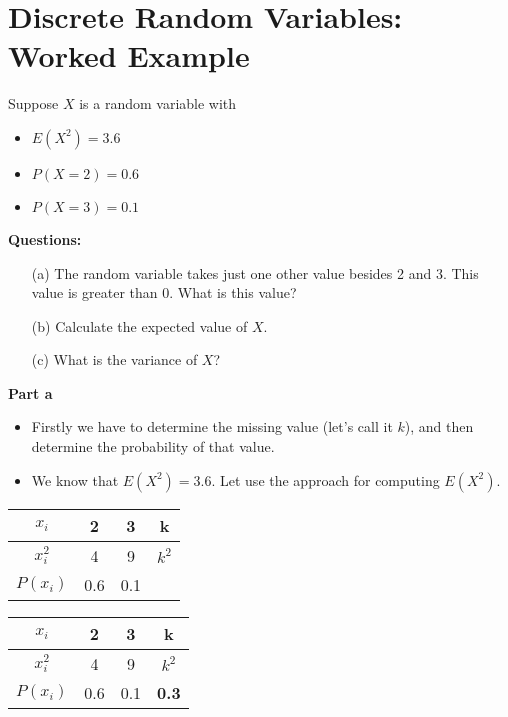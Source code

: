 \documentclass[a4paper,12pt]{article}
\begin{document}
\section*{Discrete Random Variables: Worked Example}

Suppose $X$ is a random variable with 
\begin{itemize}
\item $E(X^2)=3.6$
\item $P(X=2)=0.6$
\item $P(X=3)=0.1$
\end{itemize}


\noindent \textbf{Questions:}
\begin{itemize}
\item[(a)] The random variable takes just one other value besides 2 and 3. This value is greater than 0. What is this value?
\item[(b)] Calculate the expected value of $X$.
\item[(c)] What is the variance of $X$?
\end{itemize}





\noindent \textbf{Part a}
\begin{itemize}
\item Firstly we have to determine the missing value (let's call it $k$), and then determine the probability of that value. 
\item We know that $E(X^2)=3.6$. Let use the approach for computing $E(X^2)$.

\end{itemize}

\begin{center}
\begin{tabular}{|c|c|c|c|}
\hline
$x_i$ & \phantom{sp}2\phantom{sp} & \phantom{sp}3\phantom{sp} & \phantom{sp}k\phantom{sp} \\ \hline
$x^2_i$ & 4 & 9 & $k^2$ \\ \hline
$P(x_i)$ & 0.6 &  0.1 &  \\ \hline 
\end{tabular}
\end{center}


\begin{center}
\begin{tabular}{|c|c|c|c|}
\hline
$x_i$ & \phantom{sp}2\phantom{sp} & \phantom{sp}3\phantom{sp} & \phantom{sp}k\phantom{sp} \\ \hline
$x^2_i$ & 4 & 9 & $k^2$ \\ \hline
$P(x_i)$ & 0.6 &  0.1 & \textbf{0.3} \\ \hline 
\end{tabular}
\end{center}
\end{document}

